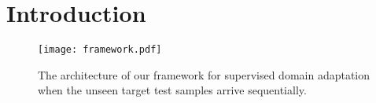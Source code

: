 \documentclass{article}
\begin{document}
\section{Introduction}
\label{sect:intro}
\begin{figure*}
    \centering
    \texttt{[image: framework.pdf]}
    \vspace{-.8cm}
    \caption{The architecture of our framework for supervised domain adaptation when the unseen target test samples arrive sequentially.}
    \vspace{-5mm}
    \label{fig:method}
\end{figure*}
    


    
\end{document}
